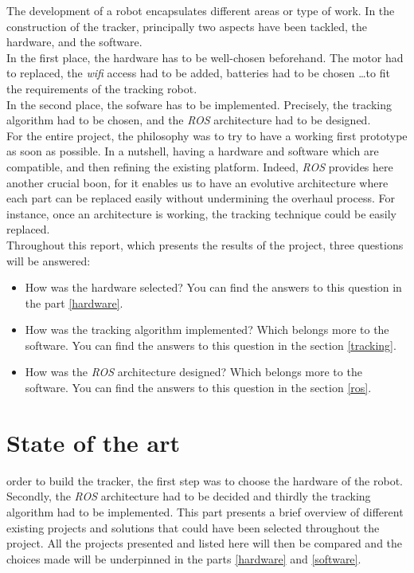 		The development of a robot encapsulates different areas or type of work.
		In the construction of the tracker, principally two aspects 
		have been tackled, the hardware, and the software.
		\\\indent In the first place, the hardware has to be well-chosen beforehand.
		The motor had to replaced, the \textit{wifi} access had to be added, batteries 
		had to be chosen \dots to fit the requirements of the tracking robot.
		\\\indent In the second place, the sofware has to be implemented. Precisely, 
		the tracking algorithm had to be chosen, and the \textit{ROS} architecture had 
		to be designed.
		\\\indent For the entire project, the philosophy was to try to have 
		a working first prototype as soon as possible. In a nutshell, 
		having a hardware and software which are compatible, and then refining
		the existing platform. Indeed, \textit{ROS} provides here another
		crucial boon, for it enables us to have an evolutive architecture 
		where each part can be replaced easily without 
		undermining the overhaul process. For instance, once 
		an architecture is working, the tracking technique could
		be easily replaced.
		\\\indent Throughout this report, which presents the 
		results of the project, three questions will be answered:
		\begin{itemize}
			\item[\textbullet] How was the hardware selected?
			You can find the answers to 
			this question in the part \vref{hardware}.
			\item[\textbullet] How was the tracking algorithm implemented? Which belongs 
			more to the software. You can find the answers to 
			this question in the section \vref{tracking}.
			\item[\textbullet] How was the \textit{ROS} architecture designed? 
			Which belongs more to the software. You can find the answers to 
			this question in the section \vref{ros}.
		\end{itemize}
		
\chapter{State of the art}\label{stateofart}

		 order to build the tracker, the first step was to choose the
		hardware of the robot. Secondly, the \textit{ROS} architecture had to be decided
		and thirdly the tracking algorithm had to be implemented. This part 
		presents a brief overview of different existing projects and solutions 
		that could have been selected throughout the project. All the projects
		presented and listed here will then be compared and the choices
		made will be underpinned in the parts \vref{hardware} and \vref{software}.
		
